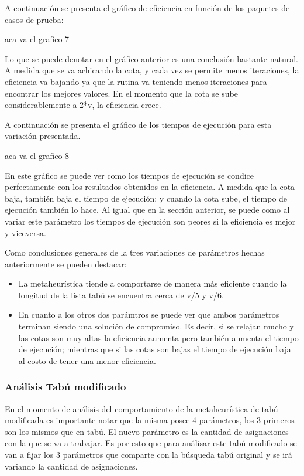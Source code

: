 \documentclass[a4paper,10pt]{article}
\begin{document}
A continuaci\'on se presenta el gr\'afico de eficiencia en funci\'on de los paquetes de casos de prueba:

aca va el grafico 7

Lo que se puede denotar en el gr\'afico anterior es una conclusi\'on bastante natural. A medida que se va achicando la cota, y cada vez se permite menos iteraciones, la eficiencia va bajando ya que la rutina va teniendo menos iteraciones para encontrar los mejores valores. En el momento que la cota se sube considerablemente a 2*v, la eficiencia crece.

A continuaci\'on se presenta el gr\'afico de los tiempos de ejecuci\'on para esta variaci\'on presentada.

aca va el grafico 8

En este gr\'afico se puede ver como los tiempos de ejecuci\'on se condice perfectamente con los resultados obtenidos en la eficiencia. A medida que la cota baja, tambi\'en baja el tiempo de ejecuci\'on; y cuando la cota sube, el tiempo de ejecuci\'on tambi\'en lo hace. Al igual que en la secci\'on anterior, se puede como al variar este par\'ametro los tiempos de ejecuci\'on son peores si la eficiencia es mejor y viceversa.


\bigskip

Como conclusiones generales de la tres variaciones de par\'ametros hechas anteriormente se pueden destacar:

\begin{itemize}
\item La metaheur\'istica tiende a comportarse de manera m\'as eficiente cuando la longitud de la lista tab\'u se encuentra cerca de v/5 y v/6.
\item En cuanto a los otros dos par\'amtros se puede ver que ambos par\'ametros terminan siendo una soluci\'on de compromiso. Es decir, si se relajan mucho y las cotas son muy altas la eficiencia aumenta pero tambi\'en aumenta el tiempo de ejecuci\'on; mientras que si las cotas son bajas el tiempo de ejecuci\'on baja al costo de tener una menor eficiencia. 
\end{itemize}

\subsubsection*{An\'alisis Tab\'u modificado}

En el momento de an\'alisis del comportamiento de la metaheur\'istica de tab\'u modificada es importante notar que la misma posee 4 par\'ametros, los 3 primeros son los mismos que en tab\'u. El nuevo par\'ametro es la cantidad de asignaciones con la que se va a trabajar. Es por esto que para an\'alisar este tab\'u modificado se van a fijar los 3 par\'ametros que comparte con la b\'usqueda tab\'u original y se ir\'a variando la cantidad de asignaciones. 
\end{document}
